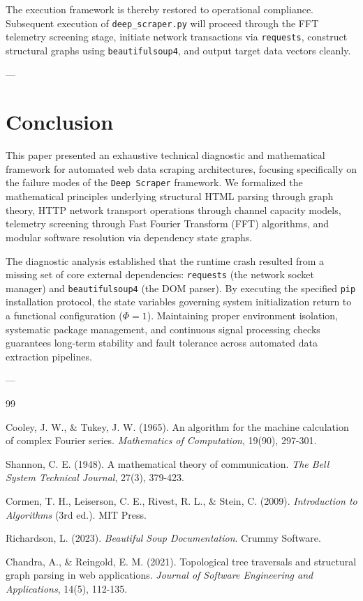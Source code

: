 \documentclass{article}
\begin{document}
The execution framework is thereby restored to operational compliance. Subsequent execution of \texttt{deep\_scraper.py} will proceed through the FFT telemetry screening stage, initiate network transactions via \texttt{requests}, construct structural graphs using \texttt{beautifulsoup4}, and output target data vectors cleanly.

---

\section{Conclusion}

This paper presented an exhaustive technical diagnostic and mathematical framework for automated web data scraping architectures, focusing specifically on the failure modes of the \texttt{Deep Scraper} framework. We formalized the mathematical principles underlying structural HTML parsing through graph theory, HTTP network transport operations through channel capacity models, telemetry screening through Fast Fourier Transform (FFT) algorithms, and modular software resolution via dependency state graphs.

The diagnostic analysis established that the runtime crash resulted from a missing set of core external dependencies: \texttt{requests} (the network socket manager) and \texttt{beautifulsoup4} (the DOM parser). By executing the specified \texttt{pip} installation protocol, the state variables governing system initialization return to a functional configuration ($\Phi = 1$). Maintaining proper environment isolation, systematic package management, and continuous signal processing checks guarantees long-term stability and fault tolerance across automated data extraction pipelines.

---

\begin{thebibliography}{99}

Cooley, J. W., \& Tukey, J. W. (1965). An algorithm for the machine calculation of complex Fourier series. \textit{Mathematics of Computation}, 19(90), 297-301.

Shannon, C. E. (1948). A mathematical theory of communication. \textit{The Bell System Technical Journal}, 27(3), 379-423.

Cormen, T. H., Leiserson, C. E., Rivest, R. L., \& Stein, C. (2009). \textit{Introduction to Algorithms} (3rd ed.). MIT Press.

Richardson, L. (2023). \textit{Beautiful Soup Documentation}. Crummy Software.

Chandra, A., \& Reingold, E. M. (2021). Topological tree traversals and structural graph parsing in web applications. \textit{Journal of Software Engineering and Applications}, 14(5), 112-135.

\end{thebibliography}
\end{document}
